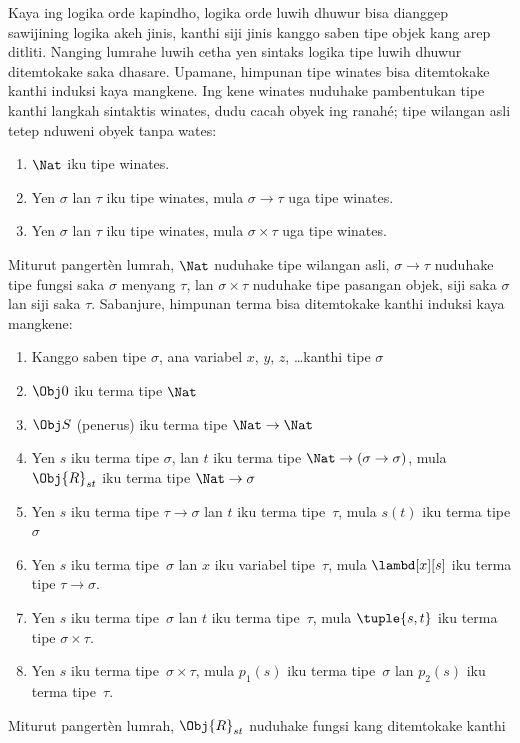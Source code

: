 \documentclass[../../../include/open-logic-section]{subfiles}
\begin{document}
Kaya ing logika orde kapindho, logika orde luwih
dhuwur bisa dianggep sawijining logika akeh
jinis, kanthi siji jinis kanggo saben tipe
objek kang arep ditliti. Nanging lumrahe
luwih cetha yen sintaks logika tipe luwih
dhuwur ditemtokake saka dhasare. Upamane,
himpunan tipe winates bisa ditemtokake
kanthi induksi kaya mangkene. Ing kene winates nuduhake pambentukan tipe kanthi langkah sintaktis winates, dudu cacah obyek ing ranahé; tipe wilangan asli tetep nduweni obyek tanpa wates:
\begin{enumerate}
\item $\Nat$ iku tipe winates.
\item Yen $\sigma$ lan $\tau$ iku tipe winates,
  mula $\sigma \to \tau$ uga tipe winates.
\item Yen $\sigma$ lan $\tau$ iku tipe winates,
  mula $\sigma \times \tau$ uga tipe winates.
\end{enumerate}
Miturut pangertèn lumrah, $\Nat$ nuduhake
tipe wilangan asli, $\sigma \to \tau$ nuduhake
tipe fungsi saka $\sigma$ menyang $\tau$,
lan $\sigma \times \tau$ nuduhake tipe pasangan
objek, siji saka $\sigma$ lan siji saka $\tau$.
Sabanjure, himpunan terma bisa ditemtokake
kanthi induksi kaya mangkene:
\begin{enumerate}
\item Kanggo saben tipe $\sigma$, ana variabel
  $x$, $y$, $z$, \dots kanthi tipe $\sigma$
\item $\Obj 0$ iku terma tipe $\Nat$
\item $\Obj S$ (penerus) iku terma tipe
  $\Nat \to \Nat$
\item Yen $s$ iku terma tipe $\sigma$, lan
  $t$ iku terma tipe $\Nat \to (\sigma \to \sigma)$,
  mula $\Obj{R}_{st}$ iku terma tipe
  $\Nat \to \sigma$
\item Yen $s$ iku terma tipe $\tau \to \sigma$
  lan $t$ iku terma tipe~$\tau$, mula $s(t)$
  iku terma tipe $\sigma$
\item Yen $s$ iku terma tipe~$\sigma$ lan $x$
  iku variabel tipe~$\tau$, mula
  $\lambd[x][s]$ iku terma tipe
  $\tau \to \sigma$.
\item Yen $s$ iku terma tipe~$\sigma$ lan $t$
  iku terma tipe~$\tau$, mula $\tuple{s, t}$
  iku terma tipe $\sigma \times \tau$.
\item Yen $s$ iku terma tipe~$\sigma \times \tau$,
  mula $p_1(s)$ iku terma tipe~$\sigma$ lan
  $p_2(s)$ iku terma tipe~$\tau$.
\end{enumerate}
Miturut pangertèn lumrah, $\Obj{R}_{st}$
nuduhake fungsi kang ditemtokake kanthi
\end{document}
